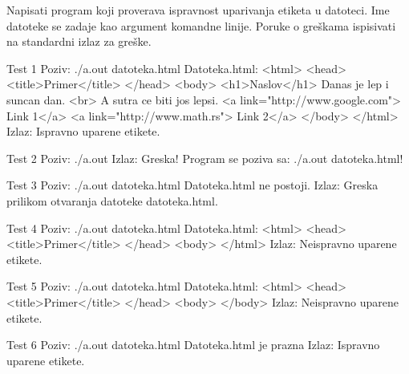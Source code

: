 \begin{Exercise}[label=605]
Napisati program koji proverava ispravnost uparivanja etiketa u  datoteci. Ime datoteke se zadaje kao argument komandne linije.
Poruke o greškama ispisivati na standardni izlaz za greške.
\begin{maxitest}
\begin{test}{Test 1}
Poziv: ./a.out datoteka.html
Datoteka.html:                          
<html>                                  
  <head>
    <title>Primer</title>
  </head>               
  <body>                                           
    <h1>Naslov</h1>                                
    Danas je lep i suncan dan. <br>                
    A sutra ce biti jos lepsi.     
    <a link="http://www.google.com"> Link 1</a>    
    <a link="http://www.math.rs"> Link 2</a>
  </body>
</html>
Izlaz: 
  Ispravno uparene etikete.
\end{test}
\end{maxitest}
\begin{miditest}
\begin{test}{Test 2}
Poziv: ./a.out 
Izlaz: 
  Greska! Program se poziva 
  sa: ./a.out datoteka.html!
\end{test}
\end{miditest}
\begin{miditest}
\begin{test}{Test 3}
Poziv: ./a.out datoteka.html
Datoteka.html ne postoji.
Izlaz: 
  Greska prilikom otvaranja 
  datoteke datoteka.html.
\end{test}
\end{miditest}
\begin{miditest}    
\begin{test}{Test 4}
Poziv: ./a.out datoteka.html
Datoteka.html:                         
<html>                                 
  <head>
  	<title>Primer</title>
  </head>               
  <body>  
</html>
Izlaz: 
  Neispravno uparene etikete.
\end{test}
\end{miditest}
\begin{miditest}      
\begin{test}{Test 5}
Poziv: ./a.out datoteka.html
Datoteka.html:                         
<html>                                  
  <head>
  	<title>Primer</title>
  </head>               
  <body>  
  </body>
Izlaz: 
  Neispravno uparene etikete.
\end{test}
\end{miditest}
\begin{miditest}
\begin{test}{Test 6}
Poziv: ./a.out datoteka.html
Datoteka.html je prazna
Izlaz: 
  Ispravno uparene etikete.
\end{test}
\end{miditest}
\end{Exercise}
\begin{Answer}[ref=605]
\end{Answer}

